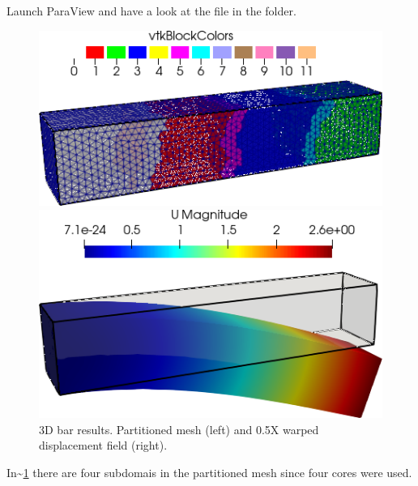 Launch ParaView and have a look at the  file in the
 folder.

\begin{figure}[htbp]
    \centering
    \begin{minipage}[t][2cm][t]{0.38\textwidth}
    \includegraphics[align=b,width=1\textwidth]{./Images/3d-bar-clamped-ends.png}
    \end{minipage}\hspace{.1\textwidth}
    \begin{minipage}[t][2cm][t]{0.4\textwidth}
    \includegraphics[align=b,width=1\textwidth]{./Images/3d-bar-clamped-pulled-partioned.png}
    \end{minipage}
    \caption{3D bar results. Partitioned mesh (left) and 0.5X warped displacement field (right).}
    \label{fig:3Dpart}
\end{figure}

In\textasciitilde{}\cref{fig:3Dpart} there are four subdomais in the
partitioned mesh since four cores were used.
